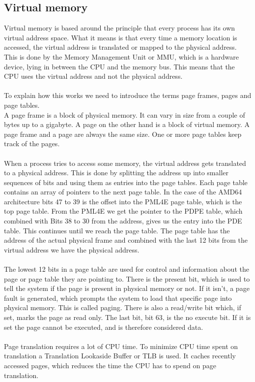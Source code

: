 \subsection{Virtual memory}
Virtual memory is based around the principle that every process has its own virtual address space. What it means is that every time a memory location is accessed, the virtual address is translated or mapped to the physical address. This is done by the Memory Management Unit or MMU, which is a hardware device, lying in between the CPU and the memory bus. This means that the CPU uses the virtual address and not the physical address.\\\\
To explain how this works we need to introduce the terms page frames, pages and page tables. \\
A page frame is a block of physical memory. It can vary in size from a couple of bytes up to a gigabyte. A page on the other hand is a block of virtual memory. A page frame and a page are always the same size. One or more page tables keep track of the pages. \\\\
When a process tries to access some memory, the virtual address gets translated to a physical address. This is done by splitting the address up into smaller sequences of bits and using them as entries into the page tables. Each page table contains an array of pointers to the next page table. In the case of the AMD64 architecture bits 47 to 39 is the offset into the PML4E page table, which is the top page table. From the PML4E we get the pointer to the PDPE table, which combined with Bits 38 to 30 from the address, gives us the entry into the PDE table. This continues until we reach the page table. The page table has the address of the actual physical frame and combined with the last 12 bits from the virtual address we have the physical address.\\\\
The lowest 12 bits in a page table are used for control and information about the page or page table they are pointing to. There is the present bit, which is used to tell the system if the page is present in physical memory or not. If it isn't, a page fault is generated, which prompts the system to load that specific page into physical memory. This is called paging. There is also a read/write bit which, if set, marks the page as read only. The last bit, bit 63, is the no execute bit. If it is set the page cannot be executed, and is therefore considered data.\\\\
Page translation requires a lot of CPU time. To minimize CPU time spent on translation a Translation Lookaside Buffer or TLB is used. It caches recently accessed pages, which reduces the time the CPU has to spend on page translation.\\\\

